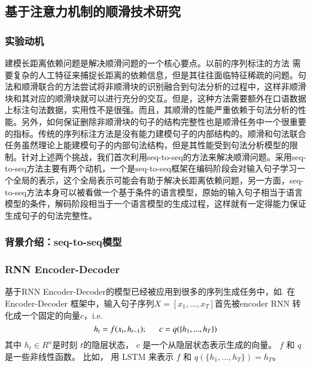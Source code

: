 \subsection{基于注意力机制的顺滑技术研究}
\subsubsection{实验动机}
建模长距离依赖问题是解决顺滑问题的一个核心要点。以前的序列标注的方法 需要复杂的人工特征来捕捉长距离的依赖信息，但是其往往面临特征稀疏的问题。句法和顺滑联合的方法尝试将非顺滑块的识别融合到句法分析的过程中，这样非顺滑块和其对应的顺滑块就可以进行充分的交互。但是，这种方法需要额外在口语数据上标注句法数据，实用性不是很强。而且，其顺滑的性能严重依赖于句法分析的性能。另外，如何保证删除非顺滑块的句子的结构完整性也是顺滑任务中一个很重要的指标。传统的序列标注方法是没有能力建模句子的内部结构的。顺滑和句法联合任务虽然理论上能建模句子的内部句法结构，但是其性能受到句法分析模型的限制。针对上述两个挑战，我们首次利用seq-to-seq的方法来解决顺滑问题。采用seq-to-seq方法主要有两个动机，一个是seq-to-seq框架在编码阶段会对输入句子学习一个全局的表示，这个全局表示可能会有助于解决长距离依赖问题，另一方面，seq-to-seq方法本身可以被看做一个基于条件的语言模型，原始的输入句子相当于语言模型的条件，解码阶段相当于一个语言模型的生成过程，这样就有一定得能力保证生成句子的句法完整性。

\subsubsection{背景介绍：seq-to-seq模型}


\subsubsection*{RNN Encoder-Decoder}

基于RNN Encoder-Decoder的模型已经被应用到很多的序列生成任务中，如.
在 Encoder-Decoder 框架中，输入句子序列$X = [x_{1}, ..., x_{T}]$首先被encoder RNN 转化成一个固定的向量$c$，i.e.
\begin{equation}
h_{t} = f(x_{t}, h_{t-1});  \indent c = q(\{h_{1}, ..., h_{T}\})
\end{equation}
其中 $h_{t} \in R^n$是时刻 $t$的隐层状态，  $c$ 是一个从隐层状态表示生成的向量。 $f$ 和 $q$ 是一些非线性函数。
比如， 用 LSTM 来表示 $f$ 和 $q(\{h_{1}, ..., h_{T}\}) = h_{T}$。

